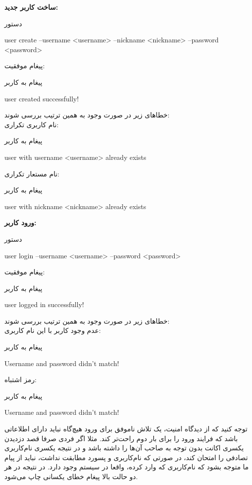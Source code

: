 \documentclass[]{article}
\begin{document}
\vspace{.5cm}
\textbf{ساخت کاربر جدید:}
\begin{mybox}[colback=yellow]{دستور}
	\begin{latin}	
		user create --username <username> --nickname <nickname> --password 
		<password>
	\end{latin}
\end{mybox}
پیغام موفقیت:
\begin{mybox}[colback=yellow]{پیغام به کاربر}
	\begin{latin}	
		user created successfully!
	\end{latin}
\end{mybox}
خطا‌های زیر در صورت وجود به همین ترتیب بررسی شوند:
\\
نام کاربری تکراری:
\begin{mybox}[colback=yellow]{پیغام به کاربر}
	\begin{latin}	
		user with username <username> already exists
	\end{latin}
\end{mybox}
نام مستعار تکراری:
\begin{mybox}[colback=yellow]{پیغام به کاربر}
	\begin{latin}	
		user with nickname <nickname> already exists
	\end{latin}
\end{mybox}

\vspace{.5cm}
\textbf{ورود کاربر:}
\begin{mybox}[colback=yellow]{دستور}
	\begin{latin}	
		user login --username <username> --password <password>
	\end{latin}
\end{mybox}
پیغام موفقیت:
\begin{mybox}[colback=yellow]{پیغام به کاربر}
	\begin{latin}	
		user logged in successfully!
	\end{latin}
\end{mybox}
خطا‌های زیر در صورت وجود به همین ترتیب بررسی شوند:
\\
عدم وجود کاربر با این نام کاربری:
\begin{mybox}[colback=yellow]{پیغام به کاربر}
	\begin{latin}	
		Username and password didn’t match!
	\end{latin}
\end{mybox}
رمز اشتباه:
\begin{mybox}[colback=yellow]{پیغام به کاربر}
	\begin{latin}	
		Username and password didn’t match!
	\end{latin}
\end{mybox}
توجه کنید که از دیدگاه امنیت، یک تلاش ناموفق برای ورود هیچ‌گاه نباید دارای 
اطلاعاتی باشد که فرایند ورود را برای بار دوم راحت‌تر کند. مثلا اگر فردی 
صرفا 
قصد دزدیدن یکسری اکانت بدون توجه به صاحب آن‌ها را داشته باشد و در نتیجه 
یکسری نام‌کاربری تصادفی را امتحان کند، در صورتی که نام‌کاربری و پسورد مطابقت 
نداشت، نباید از پیام ما متوجه بشود که نام‌کاربری که وارد کرده، واقعا در 
سیستم وجود دارد. در نتیجه در هر دو حالت بالا پیغام خطای یکسانی چاپ می‌شود.
\end{document}
